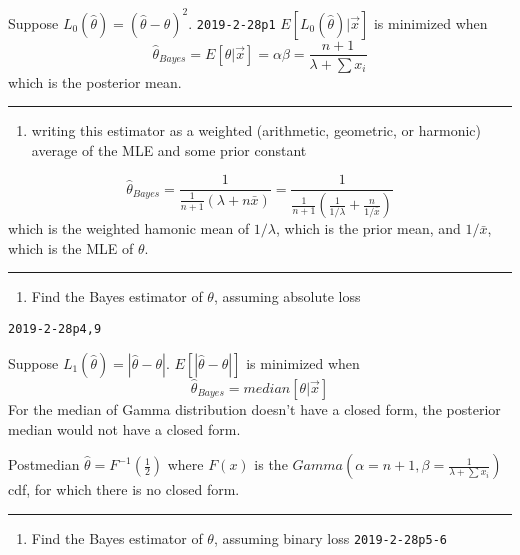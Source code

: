 \documentclass[12pt,]{article}
\providecommand{\tightlist}{%
  \setlength{\itemsep}{0pt}\setlength{\parskip}{0pt}}
\begin{document}
Suppose \(L_0(\hat\theta)=(\hat\theta-\theta)^2\). \texttt{2019-2-28p1}
\(E[L_0(\hat\theta)|\vec x]\) is minimized when
\[\hat\theta_{Bayes}=E[\theta|\vec x]=\alpha\beta=\frac{n+1}{\lambda+\sum x_i}\]
which is the posterior mean.

\begin{center}\rule{0.5\linewidth}{\linethickness}\end{center}

\begin{enumerate}
\def\labelenumi{\alph{enumi}.}
\setcounter{enumi}{2}
\tightlist
\item
  \textcolor[rgb]{0.5,0.5,0.5}{writing this estimator as a weighted (arithmetic, geometric, or harmonic) average of the MLE and some prior constant}
\end{enumerate}

\[\hat\theta_{Bayes}=\frac1{\frac1{n+1}(\lambda+n\bar x)}=\frac1{\frac1{n+1}(\frac1{1/\lambda}+\frac{n}{1/\bar x})}\]
which is the weighted hamonic mean of \(1/\lambda\), which is the prior
mean, and \(1/\bar x\), which is the MLE of \(\theta\).

\begin{center}\rule{0.5\linewidth}{\linethickness}\end{center}

\begin{enumerate}
\def\labelenumi{\alph{enumi}.}
\setcounter{enumi}{3}
\tightlist
\item
  \textcolor[rgb]{0.5,0.5,0.5}{Find the Bayes estimator of $\theta$, assuming absolute loss}
\end{enumerate}

\texttt{2019-2-28p4,9}

Suppose \(L_1(\hat\theta)=|\hat\theta-\theta|\).
\(E[|\hat\theta-\theta|]\) is minimized when
\[\hat\theta_{Bayes}=median[\theta|\vec x]\] For the median of Gamma
distribution doesn't have a closed form, the posterior median would not
have a closed form.

Postmedian \(\hat\theta=F^{-1}(\frac12)\) where \(F(x)\) is the
\(Gamma(\alpha=n+1,\beta=\frac1{\lambda+\sum x_i})\) cdf, for which
there is no closed form.

\begin{center}\rule{0.5\linewidth}{\linethickness}\end{center}

\begin{enumerate}
\def\labelenumi{\alph{enumi}.}
\setcounter{enumi}{4}
\tightlist
\item
  \textcolor[rgb]{0.5,0.5,0.5}{Find the Bayes estimator of $\theta$, assuming binary loss}
  \texttt{2019-2-28p5-6}
\end{enumerate}
\end{document}
